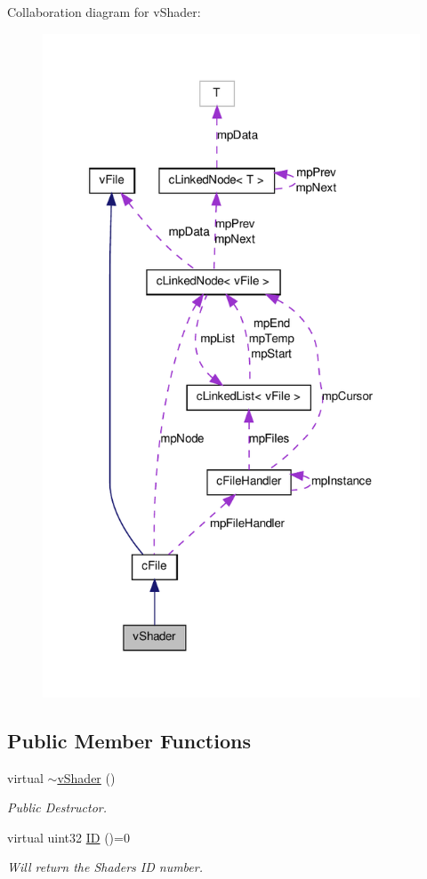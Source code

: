 Collaboration diagram for vShader:
\nopagebreak
\begin{figure}[H]
\begin{center}
\leavevmode
\includegraphics[width=320pt]{classv_shader__coll__graph}
\end{center}
\end{figure}
\subsection*{Public Member Functions}
\begin{DoxyCompactItemize}
\item 
virtual \hyperlink{classv_shader_aea8c20d266cc351b6737fed6b8dbd590}{$\sim$vShader} ()
\begin{DoxyCompactList}\small\item\em Public Destructor. \item\end{DoxyCompactList}\item 
virtual uint32 \hyperlink{classv_shader_a73376d9e91ff4d3cf3718c8f6d02dc88}{ID} ()=0
\begin{DoxyCompactList}\small\item\em Will return the Shaders ID number. \item\end{DoxyCompactList}\end{DoxyCompactItemize}


